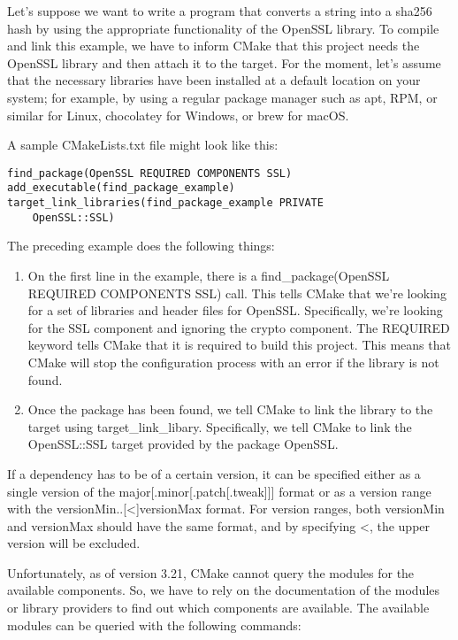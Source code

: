 Let's suppose we want to write a program that converts a string into a sha256 hash by using the appropriate functionality of the OpenSSL library. To compile and link this example, we have to inform CMake that this project needs the OpenSSL library and then attach it to the target. For the moment, let's assume that the necessary libraries have been installed at a default location on your system; for example, by using a regular package manager such as apt, RPM, or similar for Linux, chocolatey for Windows, or brew for macOS.

A sample CMakeLists.txt file might look like this:

\begin{lstlisting}[style=styleCMake]
find_package(OpenSSL REQUIRED COMPONENTS SSL)
add_executable(find_package_example)
target_link_libraries(find_package_example PRIVATE
	OpenSSL::SSL)
\end{lstlisting}

The preceding example does the following things:

\begin{enumerate}
\item 
On the first line in the example, there is a find\_package(OpenSSL REQUIRED COMPONENTS SSL) call. This tells CMake that we're looking for a set of libraries and header files for OpenSSL. Specifically, we're looking for the SSL component and ignoring the crypto component. The REQUIRED keyword tells CMake that it is required to build this project. This means that CMake will stop the configuration process with an error if the library is not found.

\item 
Once the package has been found, we tell CMake to link the library to the target using target\_link\_libary. Specifically, we tell CMake to link the OpenSSL::SSL target provided by the package OpenSSL.
\end{enumerate}

If a dependency has to be of a certain version, it can be specified either as a single version of the major[.minor[.patch[.tweak]]] format or as a version range with the versionMin..[<]versionMax format. For version ranges, both versionMin and versionMax should have the same format, and by specifying <, the upper version will be excluded.

Unfortunately, as of version 3.21, CMake cannot query the modules for the available components. So, we have to rely on the documentation of the modules or library providers to find out which components are available. The available modules can be queried with the following commands:

